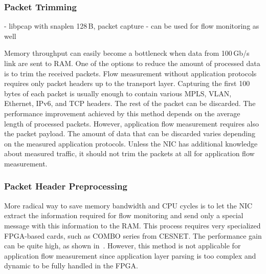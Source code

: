 \subsubsection{Packet Trimming}
\cite{Deri-2004-Improving} - libpcap with snaplen 128\,B, packet capture - can be used for flow monitoring as well

Memory throughput can easily become a bottleneck when data from 100\,Gb/s link are sent to RAM. One of the options to reduce the amount of processed data is to trim the received packets. Flow measurement without application protocols requires only packet headers up to the transport layer. Capturing the first 100 bytes of each packet is usually enough to contain various MPLS, VLAN, Ethernet, IPv6, and TCP headers. The rest of the packet can be discarded. The performance improvement achieved by this method depends on the average length of processed packets. However, application flow measurement requires also the packet payload. The amount of data that can be discarded varies depending on the measured application protocols. Unless the NIC has additional knowledge about measured traffic, it should not trim the packets at all for application flow measurement.

\subsubsection{Packet Header Preprocessing}
More radical way to save memory bandwidth and CPU cycles is to let the NIC extract the information required for flow monitoring and send only a special message with this information to the RAM. This process requires very specialized FPGA-based cards, such as COMBO series from CESNET. The performance gain can be quite high, as shown in~\cite{Velan-2015-High}. However, this method is not applicable for application flow measurement since application layer parsing is too complex and dynamic to be fully handled in the FPGA.

